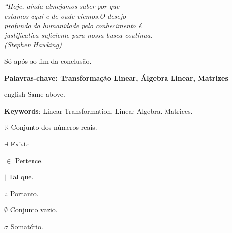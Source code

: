 \documentclass[
12pt,
 a4paper,
    english,
    brazil,
    oneside
    ]{abntex2}
\begin{document}
	\begin{epigrafe}
		\vspace*{\fill}
		\begin{flushright}
			\textit{``Hoje, ainda almejamos saber por que\\
				estamos aqui e de onde viemos.O desejo\\
				profundo da humanidade pelo	conhecimento é\\
				justificativa suficiente para nossa busca contínua.\\
				(Stephen Hawking)}
		\end{flushright}
	\end{epigrafe}
	
	
	\setlength{\absparsep}{18pt} %
	\begin{resumo}
		Só após ao fim da conclusão.
		
		\textbf{Palavras-chave: Transformação Linear, Álgebra Linear, Matrizes}
	\end{resumo}
		
	
	\begin{resumo}[Abstract]
		\begin{otherlanguage*}{english}
			Same above.
			
			\vspace{\onelineskip}
			
			\noindent 
			\textbf{Keywords}: Linear Transformation, Linear Algebra. Matrices.
		\end{otherlanguage*}
	\end{resumo}
	
	\listoftables*
	\cleardoublepage
	
	\begin{simbolos}
		\item[$ \mathbb{R} $] Conjunto dos números reais.
		\item[$\exists$] Existe.
		\item[$\in$] Pertence.
		\item[$\mid$] Tal que.
		\item[$\therefore$] Portanto.
		\item[$\emptyset$] Conjunto vazio.
		\item[$\sigma$] Somatório.
	\end{simbolos}
	
	
	\tableofcontents*
	\cleardoublepage
	
	
	\textual
	
	
		
	
	
	
	
	
	
	
		
	
	

		
\end{document}
